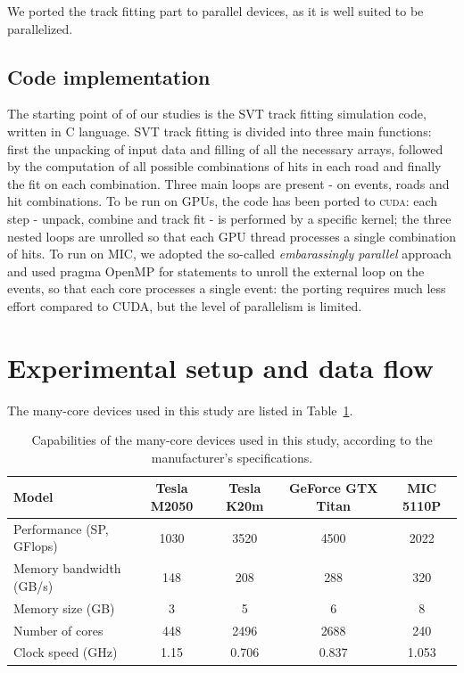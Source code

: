 \documentclass[letterpaper]{jpconf}
\begin{document}
We ported the track fitting part to parallel devices, as it is well suited to 
be parallelized. 

\subsection{Code implementation}
The starting point of of our studies is the SVT track fitting simulation code, 
written in C language. SVT track fitting is divided into three main functions: 
first the unpacking of input data and filling of all the necessary arrays, 
followed by the computation of all possible combinations of hits in each road 
and finally the fit on each combination. Three main loops are 
present - on events, roads and hit combinations. 
To be run on GPUs, the code has been ported to \textsc{cuda}: each step - 
unpack, combine and track fit - is performed by a specific kernel;
the three nested loops are unrolled so that each GPU thread processes a 
single combination of hits. 
To run on MIC, we adopted the so-called \textit{embarassingly parallel} 
approach and used pragma OpenMP for statements to unroll the external loop 
on the events, so that each core processes a single event: the porting 
requires much less effort compared to CUDA, but the level of parallelism is 
limited.

\section{Experimental setup and data flow}
The many-core devices used in this study are listed in Table~\ref{tab_hwspecs}.

\begin{table}[!t]
  \centering
  \begin{tabular}{|l|c|c|c|c|}
    \hline
    Model & Tesla M2050 & Tesla K20m & GeForce GTX  Titan & MIC 5110P \\
    \hline
    \hline
    Performance (SP, GFlops) & 1030 & 3520 & 4500 & 2022 \\
    Memory bandwidth  (GB/s) & 148 & 208 & 288  & 320\\   
    Memory size (GB) & 3 & 5 & 6 & 8 \\
    Number of cores & 448 & 2496 & 2688 & 240 \\
    Clock speed (GHz) & 1.15 & 0.706 & 0.837 & 1.053 \\
    \hline
  \end{tabular}
  \caption{Capabilities of the many-core devices used in this study, according to the manufacturer's specifications.}
  \label{tab_hwspecs}
\end{table}
\end{document}
